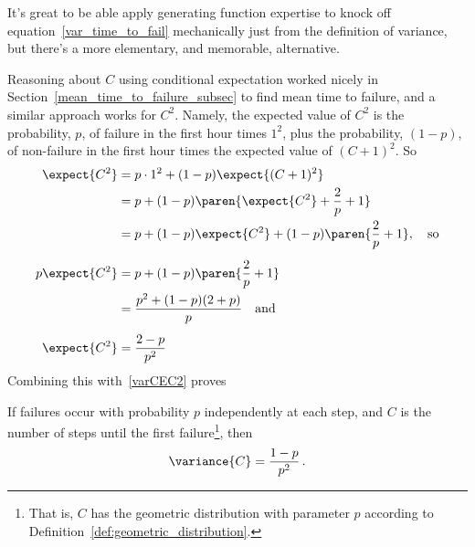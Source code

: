 It's great to be able apply generating function expertise to knock off
equation~\eqref{var_time_to_fail} mechanically just from the definition of
variance, but there's a more elementary, and memorable, alternative.\fi

Reasoning about $C$ using conditional expectation worked nicely in
Section~\ref{mean_time_to_failure_subsec} to find mean time to
failure, and a similar approach works for $C^2$.  Namely, the expected
value of $C^2$ is the probability, $p$, of failure in the first hour
times $1^2$, plus the probability, $(1-p)$, of non-failure in the
first hour times the expected value of $(C+1)^2$.  So
\begin{align*}
\expect{C^2} & = p\cdot 1^2 + (1-p)\expect{(C+1)^2}\\
             & = p + (1-p) \paren{\expect{C^2} + \frac{2}{p} +1}\\
             & = p+ (1-p)\expect{C^2} + (1-p)\paren{\frac{2}{p} + 1},
                \quad\text{so}\\[5pt]
p \expect{C^2} & = p+ (1-p)\paren{\frac{2}{p} + 1}\\
               & = \frac{p^2+(1-p)(2+p)}{p} \quad\text{and}\\[5pt]
\expect{C^2} & = \frac{2 -p}{p^2} %
\end{align*}
Combining this with~\eqref{varCEC2} proves
\begin{lemma}\label{lem:var_time_to_fail}
If failures occur with probability $p$ independently at each step, and
$C$ is the number of steps until the first failure\footnote{That is,
  $C$ has the geometric distribution with parameter $p$ according to
  Definition~\ref{def:geometric_distribution}.}, then
\begin{equation}\label{var_time_to_fail}
\variance{C} = \frac{1-p}{p^2} \,.
\end{equation}
\end{lemma}

